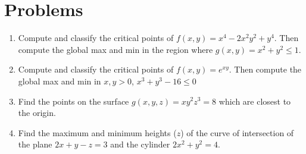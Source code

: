 \documentclass[letterpaper,11pt]{article}
\begin{document}
\section*{Problems}
\begin{enumerate}
\item Compute and classify the critical points of $f(x, y) = x^4 - 2 x^2 y^2 + y^4$.
  Then compute the global max and min in the region where $g(x, y) = x^2 + y^2 \leq 1$.
  \newline
  \newline
  \newline
  \newline
  \newline
  \newline
  \newline
  \newline
  \newline
  \newline
  \newline
  \newline
  \newline
  \newline
  \newline
  \newline
  \newline
  \newline
  \newline
  \newline
  \newline
\item Compute and classify the critical points of $f(x, y) = e^{x y}$.
  Then compute the global max and min in $x, y > 0$, $x^3 + y^3 - 16 \leq 0$
  \newpage
\item Find the points on the surface $g(x, y, z) = x y^2 z^3 = 8$ which are closest to the origin.
  \newline
  \newline
  \newline
  \newline
  \newline
  \newline
  \newline
  \newline
  \newline
  \newline
  \newline
  \newline
  \newline
  \newline
  \newline
  \newline
  \newline
  \newline
  \newline
  \newline
\item Find the maximum and minimum heights ($z$) of the curve of intersection of the plane $2 x + y - z = 3$ and the cylinder $2 x^2 + y^2 = 4$.
\end{enumerate}
\end{document}
